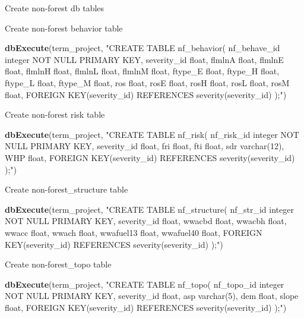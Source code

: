 \documentclass[]{book}
\newenvironment{Shaded}{\begin{snugshade}}{\end{snugshade}}
\newcommand{\KeywordTok}[1]{\textcolor[rgb]{0.13,0.29,0.53}{\textbf{#1}}}
\newcommand{\NormalTok}[1]{#1}
\newcommand{\StringTok}[1]{\textcolor[rgb]{0.31,0.60,0.02}{#1}}
\begin{document}
Create non-forest db tables

Create non-forest behavior table

\begin{Shaded}
\begin{Highlighting}[]
\KeywordTok{dbExecute}\NormalTok{(term_project, }\StringTok{"CREATE TABLE nf_behavior(}
\StringTok{nf_behave_id integer NOT NULL PRIMARY KEY,}
\StringTok{severity_id float,}
\StringTok{flmlnA float,}
\StringTok{flmlnE float,}
\StringTok{flmlnH float,}
\StringTok{flmlnL float,}
\StringTok{flmlnM float,}
\StringTok{ftype_E float,}
\StringTok{ftype_H float,}
\StringTok{ftype_L float,}
\StringTok{ftype_M float,}
\StringTok{ros float,}
\StringTok{rosE float,}
\StringTok{rosH float,}
\StringTok{rosL float,}
\StringTok{rosM float,}
\StringTok{FOREIGN KEY(severity_id) REFERENCES severity(severity_id)}
\StringTok{);"}\NormalTok{)}
\end{Highlighting}
\end{Shaded}

Create non-forest risk table

\begin{Shaded}
\begin{Highlighting}[]
\KeywordTok{dbExecute}\NormalTok{(term_project, }\StringTok{"CREATE TABLE nf_risk(}
\StringTok{nf_risk_id integer NOT NULL PRIMARY KEY,}
\StringTok{severity_id float,}
\StringTok{fri float,}
\StringTok{fti float,}
\StringTok{sdr varchar(12),}
\StringTok{WHP float,}
\StringTok{FOREIGN KEY(severity_id) REFERENCES severity(severity_id)}
\StringTok{);"}\NormalTok{)}
\end{Highlighting}
\end{Shaded}

Create non-forest\_structure table

\begin{Shaded}
\begin{Highlighting}[]
\KeywordTok{dbExecute}\NormalTok{(term_project, }\StringTok{"CREATE TABLE nf_structure(}
\StringTok{nf_str_id integer NOT NULL PRIMARY KEY,}
\StringTok{severity_id float,}
\StringTok{wwacbd float,}
\StringTok{wwacbh float,}
\StringTok{wwacc float,}
\StringTok{wwach float,}
\StringTok{wwafuel13 float,}
\StringTok{wwafuel40 float,}
\StringTok{FOREIGN KEY(severity_id) REFERENCES severity(severity_id)}
\StringTok{);"}\NormalTok{)}
\end{Highlighting}
\end{Shaded}

Create non-forest\_topo table

\begin{Shaded}
\begin{Highlighting}[]
\KeywordTok{dbExecute}\NormalTok{(term_project, }\StringTok{"CREATE TABLE nf_topo(}
\StringTok{nf_topo_id integer NOT NULL PRIMARY KEY,}
\StringTok{severity_id float,}
\StringTok{asp varchar(5),}
\StringTok{dem float,}
\StringTok{slope float,}
\StringTok{FOREIGN KEY(severity_id) REFERENCES severity(severity_id)}
\StringTok{);"}\NormalTok{)}
\end{Highlighting}
\end{Shaded}
\end{document}
